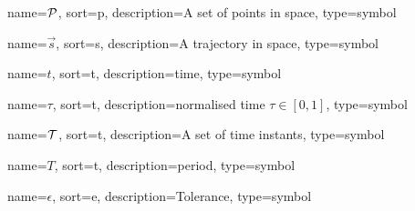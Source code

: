	{%
		name={\ensuremath{\set{P}}},
		sort=p,
		description=A set of points in space,
		type=symbol
	}
	\newcommand{\setofpoints}{\gls{sym:setofpoints}}

	{%
		name={\ensuremath{\vec{s}}},
		sort=s,
		description=A trajectory in space,
		type=symbol
	}
	\newcommand{\traj}{\gls{sym:traj}}

	\newcommand{\pathsym}{\traj}


	{%
		name={\ensuremath{t}},
		sort=t,
		description=time,
		type=symbol
	}
	\newcommand{\timesym}{\gls{sym:time}}

	{%
		name={\ensuremath{\tau}},
		sort=t,
		description=normalised time \ensuremath{\tau \in [0, 1]},
		type=symbol
	}
	\newcommand{\timenorm}{\gls{sym:timenorm}}

	{%
		name={\ensuremath{\set{T}}},
		sort=t,
		description=A set of time instants,
		type=symbol
	}
	\newcommand{\setoftimeinstants}{\gls{sym:setoftimeinstants}}

	{%
		name={\ensuremath{T}},
		sort=t,
		description=period,
		type=symbol
	}
	\newcommand{\period}{\gls{sym:period}}

	{%
		name={\ensuremath{\epsilon}},
		sort=e,
		description=Tolerance,
		type=symbol
	}
	\newcommand{\tol}{\gls{sym:tolerance}}

